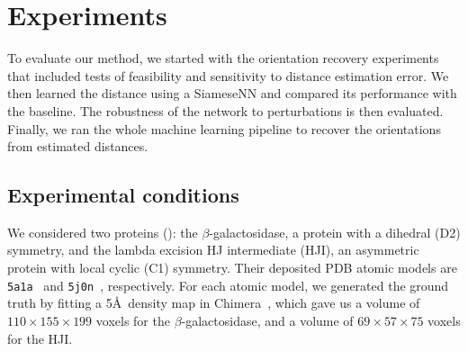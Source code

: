 \section{Experiments}

To evaluate our method, we started with the orientation recovery experiments that included tests of feasibility and sensitivity to distance estimation error. 
We then learned the distance using a SiameseNN and compared its performance with the baseline. 
The robustness of the network to perturbations is then evaluated.
Finally, we ran the whole machine learning pipeline to recover the orientations from estimated distances.

\subsection{Experimental conditions}\label{sec:results:data}

We considered two proteins (): the $\beta$-galactosidase, a protein with a dihedral (D2) symmetry, and the lambda excision HJ intermediate (HJI), an asymmetric protein with local cyclic (C1) symmetry. 
Their deposited PDB atomic models are \texttt{5a1a}~\cite{bartesaghi2015betagal} and \texttt{5j0n}~\cite{laxmikanthan2016structure}, respectively.
For each atomic model, we generated the ground truth by fitting a 5\AA\ density map in Chimera~\cite{pettersen2004ucsf}, which gave us a volume of $110 \times 155 \times 199$ voxels for the $\beta$-galactosidase, and a volume of $69 \times 57 \times 75$ voxels for the HJI.


